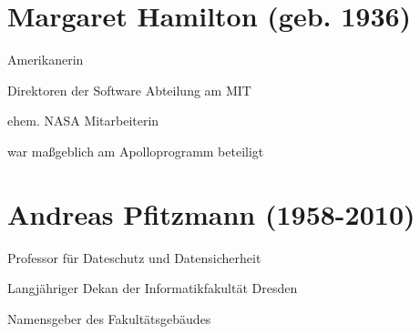 \documentclass[a4paper,12pt]{report}
\begin{document}
\section*{Margaret Hamilton (geb. 1936)}
\begin{itemize*}
    \item Amerikanerin
    \item Direktoren der Software Abteilung am MIT
    \item ehem. NASA Mitarbeiterin
    \item war maßgeblich am Apolloprogramm beteiligt
\end{itemize*}

\section*{Andreas Pfitzmann (1958-2010)}
\begin{itemize*}
    \item Professor für Dateschutz und Datensicherheit
    \item Langjähriger Dekan der Informatikfakultät Dresden
    \item Namensgeber des Fakultätsgebäudes
\end{itemize*}

\pagebreak
\end{document}
